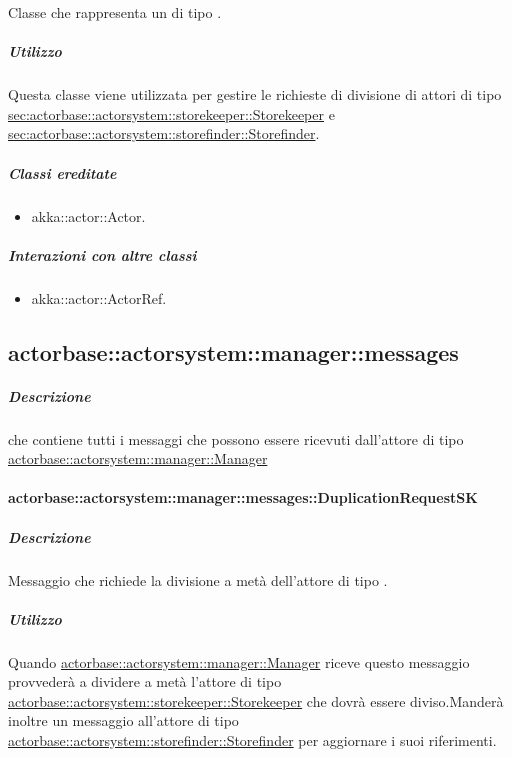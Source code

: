 \documentclass{scalatekids-article}
\begin{document}
Classe che rappresenta un  di tipo .

\subparagraph{Utilizzo}

Questa classe viene utilizzata per gestire le richieste di divisione di attori di tipo
\hyperref[sec:actorbase::actorsystem::storekeeper::Storekeeper]{sec:actorbase::\allowbreak{}actorsystem::\allowbreak{}storekeeper::\allowbreak{}Storekeeper}
e \hyperref[sec:actorbase::actorsystem::storefinder::Storefinder]{sec:actorbase::\allowbreak{}actorsystem::\allowbreak{}storefinder::\allowbreak{}Storefinder}.

\subparagraph{Classi ereditate}

\begin{itemize}

\item akka::actor::Actor.

\end{itemize}

\subparagraph{Interazioni con altre classi}

\begin{itemize}
\item akka::actor::ActorRef.
\end{itemize}

\subsection{actorbase::actorsystem::manager::messages}
\label{sec:actorbase::actorsystem::manager::messages}

\subparagraph{Descrizione}

 che contiene tutti i messaggi che possono essere ricevuti
dall'attore di tipo
\hyperref[sec:actorbase::actorsystem::manager::Manager]{actorbase::actorsystem::manager::Manager}

\paragraph{actorbase::actorsystem::manager::messages::DuplicationRequestSK}
\label{sec:actorbase::actorsystem::manager::messages::DuplicationRequestSK}

\subparagraph{Descrizione}

Messaggio che richiede la divisione a metà dell'attore di tipo
.

\subparagraph{Utilizzo}

Quando \hyperref[sec:actorbase::actorsystem::manager::Manager]{actorbase::\allowbreak{}actorsystem::\allowbreak{}manager::\allowbreak{}Manager}
riceve questo messaggio provvederà a dividere a metà l'attore di tipo
\hyperref[sec:actorbase::actorsystem::storekeeper::Storekeeper]{actorbase::\allowbreak{}actorsystem::\allowbreak{}storekeeper::\allowbreak{}Storekeeper}
che dovrà essere diviso.Manderà inoltre un messaggio all'attore di tipo
\hyperref[sec:actorbase::actorsystem::storefinder::Storefinder]{actorbase::\allowbreak{}actorsystem::\allowbreak{}storefinder::\allowbreak{}Storefinder}
per aggiornare i suoi riferimenti.
\end{document}

